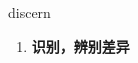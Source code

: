 
\begin{frame}
{\huge discern}
\begin{center}
\begin{enumerate}\Large
  \item \textbf{识别，辨别差异}
\end{enumerate}
\end{center}
\end{frame}
